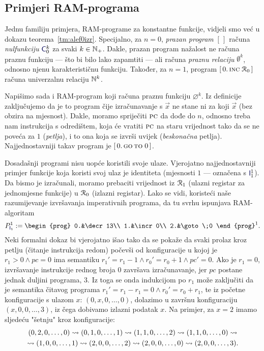 \subsection{Primjeri RAM-programa}

Jednu familiju primjera, RAM-programe za konstantne funkcije, vidjeli smo već u dokazu teorema~\ref{tm:alef0izr}. Specijalno, za $n=0$, \emph{prazan program} $[\,]$ računa \emph{nulfunkciju} $\f{C}_0^k$ za svaki $k\in{\mathbb N}_+$. Dakle, prazan program nažalost ne računa praznu funkciju --- što bi bilo lako zapamtiti --- ali računa \emph{praznu relaciju} $\emptyset^k$, odnosno njenu karakterističnu funkciju. Također, za $n=1$, program $[\,0.\,\textsc{inc}\;\mathcal R_{0}\,]$ računa univerzalnu relaciju ${\mathbb N}^k$.

Napišimo sada i RAM-program koji računa praznu funkciju $\varnothing^k$. Iz definicije zaključujemo da je to program čije izračunavanje s $\vec x$ ne stane ni za koji $\vec x$ (bez obzira na mjesnost). Dakle, moramo spriječiti $\textsc{pc}$ da dođe do $n$, odnosno treba nam instrukcija s odredištem, koja će vratiti $\textsc{pc}$ na staru vrijednost tako da se ne poveća za $1$ (\emph{petlja}), i to ona koja se izvrši uvijek (\emph{beskonačna} petlja). Najjednostavniji takav program je $[\,0.\,\textsc{go\,to}\;0\,]$.

Dosadašnji programi nisu uopće koristili svoje ulaze. Vjerojatno najjednostavniji primjer funkcije koja koristi svoj ulaz je identiteta (mjesnosti $1$ --- označena s $\f{I}_1^1$). Da bismo je izračunali, moramo prebaciti vrijednost iz $\mathcal R_{1}$ (ulazni registar za jednomjesne funkcije) u $\mathcal R_{0}$ (izlazni registar). Lako se vidi, koristeći naše razumijevanje izvršavanja imperativnih programa, da tu svrhu ispunjava RAM-algoritam
\begin{equation}
    P_{\f I_1}^1:=\begin{prog}
        0.&\decr13\\
        1.&\incr0\\
        2.&\goto\;0
    \end{prog}^1\text.
\end{equation}
Neki formalni dokaz bi vjerojatno išao tako da se pokaže da svaki prolaz kroz petlju (čitanje instrukcija redom) počevši od konfiguracije u kojoj je $r_1>0\land pc=0$ ima semantiku $r_1'=r_1-1\land r_0'=r_0+1\land pc'=0$. Ako je $r_1=0$, izvršavanje instrukcije rednog broja $0$ završava izračunavanje, jer $pc$ postane jednak duljini programa, $3$. Iz toga se onda indukcijom po $r_1$ može zaključiti da je semantika čitavog programa $r_1'=r_1-r_1=0\land r_0'=r_0+r_1$, te iz početne konfiguracije s ulazom $x$: $(0,x,0,\dotsc,0)$, dolazimo u završnu konfiguraciju $(x,0,0,\dotsc,3)$, iz čega dobivamo izlazni podatak $x$. Na primjer, za $x=2$ imamo sljedeću "šetnju" kroz konfiguracije:
\begin{multline}
    (0,2,0,\dotsc,0)\leadsto
    (0,1,0,\dotsc,1)\leadsto
    (1,1,0,\dotsc,2)\leadsto
    (1,1,0,\dotsc,0)\leadsto\\
    \leadsto(1,0,0,\dotsc,1)\leadsto
    (2,0,0,\dotsc,2)\leadsto
    (2,0,0,\dotsc,0)\leadsto
    (2,0,0,\dotsc,3)\text.
\end{multline}

